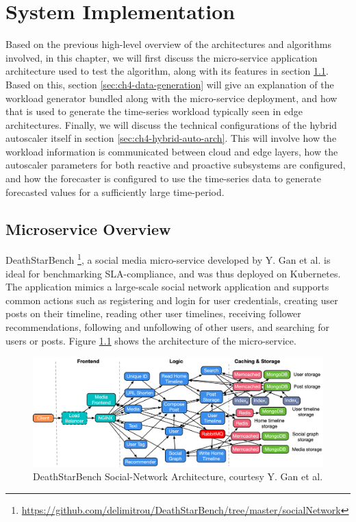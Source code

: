 \clearpage

\def\chaptertitle{System Implementation}

\lhead{\emph{\chaptertitle}}

\chapter{\chaptertitle}
\label{ch:experimental-setup}

Based on the previous high-level overview of the architectures and algorithms involved, in this chapter, we will first discuss the micro-service application architecture used to test the algorithm, along with its features in section \ref{sec:ch4-microservice-overview}. Based on this, section \ref{sec:ch4-data-generation} will give an explanation of the workload generator bundled along with the micro-service deployment, and how that is used to generate the time-series workload typically seen in edge architectures. Finally, we will discuss the technical configurations of the hybrid autoscaler itself in section \ref{sec:ch4-hybrid-auto-arch}. This will involve how the workload information is communicated between cloud and edge layers, how the autoscaler parameters for both reactive and proactive subsystems are configured, and how the forecaster is configured to use the time-series data to generate forecasted values for a sufficiently large time-period.

\section{Microservice Overview}
\label{sec:ch4-microservice-overview}

DeathStarBench \footnote{\url{https://github.com/delimitrou/DeathStarBench/tree/master/socialNetwork}}, a social media micro-service developed by Y. Gan et al. \cite{gan2019open} is ideal for benchmarking SLA-compliance, and was thus deployed on Kubernetes. The application mimics a large-scale social network application and supports common actions such as registering and login for user credentials, creating user posts on their timeline, reading other user timelines, receiving follower recommendations, following and unfollowing of other users, and searching for users or posts. Figure \ref{fig:social-network-arch} shows the architecture of the micro-service.\par

\begin{figure}[htb]
    \centering
    \caption{DeathStarBench Social-Network Architecture, courtesy Y. Gan et al. \cite{gan2019open}}
    \label{fig:social-network-arch}
    \includegraphics[width=1.0\linewidth]{Figures/Social-Network-Architecture.pdf}
\end{figure}

